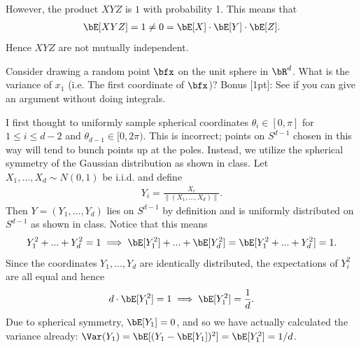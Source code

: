 \begin{homework}[e]
\begin{prf}
    \bigskip

    However, the product $XYZ$ is $1$ with probability 1. This means that
    \begin{align*}
      \bE[XYZ] = 1 \neq 0 = \bE[X]\cdot \bE[Y]\cdot \bE[Z].
    \end{align*}
    Hence $XYZ$ are not mutually independent.
  \end{prf}
  \prob Consider drawing a random point $\bfx$ on the unit sphere in $\bR^d$. What is the variance of $x_1$ (i.e. The first coordinate of $\bfx$)? Bonus [1pt]: See if you can give an argument without doing integrals.
  \begin{prf}
    I first thought to uniformly sample spherical coordinates $\theta_i \in [0,\pi]$ for $1\leq i\leq d-2$ and $\theta_{d-1} \in [0,2\pi)$. This is incorrect; points on $S^{d-1}$ chosen in this way will tend to bunch points up at the poles. Instead, we utilize the spherical symmetry of the Gaussian distribution as shown in class. Let $X_1,...,X_d \sim N(0,1)$ be i.i.d. and define
    \begin{align*}
      Y_i = \frac{X_i}{\|(X_1,...,X_d)\|}.
    \end{align*}
    Then $Y = (Y_1,...,Y_d)$ lies on $S^{d-1}$ by definition and is uniformly distributed on $S^{d-1}$ as shown in class. Notice that this means
    \begin{align*}
      Y_1^2 + ... + Y_d^2 = 1 \implies \bE[Y_1^2]+...+\bE[Y_d^2] = \bE[Y_1^2 + ... + Y_d^2] = 1.
    \end{align*}
    Since the coordinates $Y_1,...,Y_d$ are identically distributed, the expectations of $Y_i^2$ are all equal and hence
    \begin{align*}
      d\cdot \bE[Y_1^2] = 1 \implies \bE[Y_1^2] = \frac{1}{d}.
    \end{align*}
    Due to spherical symmetry, $\bE[Y_1] = 0$, and so we have actually calculated the variance already: $\Var(Y_1) = \bE[(Y_1 - \bE[Y_1])^2] = \bE[Y_1^2] = 1/d$.
  \end{prf}


\end{homework}
